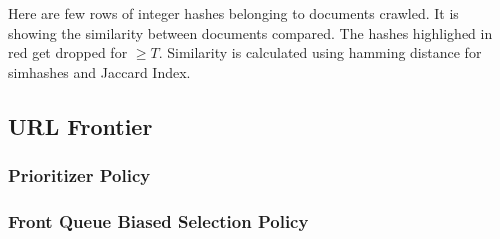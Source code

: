 \noindent
Here are few rows of integer hashes belonging to documents crawled. It is showing the similarity between
documents compared. The hashes highlighed in red get dropped for $\geq T$. Similarity is calculated using hamming distance for simhashes and Jaccard Index.
%
%

\pagebreak

\subsection{URL Frontier}
\subsubsection{Prioritizer Policy}
\subsubsection{Front Queue Biased Selection Policy}

\pagebreak